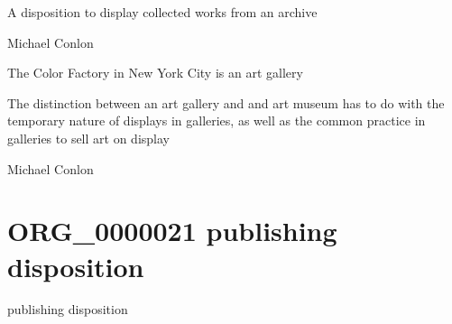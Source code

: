 \documentclass[letterpaper,10pt,english]{sphinxmanual}
\begin{document}
\begin{sphinxShadowBox}

\sphinxAtStartPar
A disposition to display collected works from an archive
\end{sphinxShadowBox}

\begin{sphinxShadowBox}

\sphinxAtStartPar
Michael Conlon 
\end{sphinxShadowBox}

\begin{sphinxShadowBox}

\sphinxAtStartPar
The Color Factory in New York City is an art gallery
\end{sphinxShadowBox}

\begin{sphinxShadowBox}

\sphinxAtStartPar
The distinction between an art gallery and and art museum has to do with the temporary nature of displays in galleries, as well as the common practice in galleries to sell art on display
\end{sphinxShadowBox}

\begin{sphinxShadowBox}

\sphinxAtStartPar
Michael Conlon 
\end{sphinxShadowBox}
\begin{quote}
\label{\detokenize{doc-ORG_0000021:org-0000021}}\label{\detokenize{doc-ORG_0000021:publishing-disposition}}\label{\detokenize{doc-ORG_0000021:org-0000021}}
\ignorespaces \end{quote}


\section{ORG\_0000021 \sphinxhyphen{} publishing disposition}
\label{\detokenize{doc-ORG_0000021:org-0000021-publishing-disposition}}\label{\detokenize{doc-ORG_0000021:index-0}}\label{\detokenize{doc-ORG_0000021::doc}}
\begin{sphinxShadowBox}

\sphinxAtStartPar
publishing disposition
\end{sphinxShadowBox}
\end{document}
